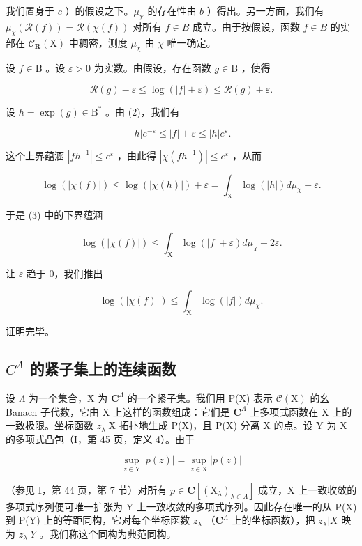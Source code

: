我们置身于 \(c\) ）的假设之下。\(\mu_{\chi}\) 的存在性由 \(b\) ）得出。另一方面，我们有 \(\mu_{\chi}(\mathcal{R}(f)) = \mathcal{R}(\chi(f))\) 对所有 \(f \in B\) 成立。由于按假设，函数 \(f \in B\) 的实部在 \(\mathcal{C}_{\mathbf{R}}(\mathrm{X})\) 中稠密，测度 \(\mu_{\chi}\) 由 \(\chi\) 唯一确定。

设 \(f \in \mathrm{B}\) 。设 \(\varepsilon > 0\) 为实数。由假设，存在函数 \(g \in \mathrm{B}\) ，使得

\[
\mathcal {R} (g) - \varepsilon \leqslant \log (| f | + \varepsilon) \leqslant \mathcal {R} (g) + \varepsilon .\tag{2}
\]

设 \(h = \exp(g) \in \mathrm{B}^*\) 。由 (2)，我们有

\[
| h | e ^ {- \varepsilon} \leqslant | f | + \varepsilon \leqslant | h | e ^ {\varepsilon}.\tag{3}
\]

这个上界蕴涵 \(|fh^{-1}| \leqslant e^{\varepsilon}\) ，由此得 \(|\chi (fh^{-1})| \leqslant e^{\varepsilon}\) ，从而

\[
\log (| \chi (f) |) \leqslant \log (| \chi (h) |) + \varepsilon = \int_ {\mathrm{X}} \log (| h |) d \mu_ {\chi} + \varepsilon .\tag{4}
\]

于是 (3) 中的下界蕴涵

\[
\log (| \chi (f) |) \leqslant \int_ {\mathrm{X}} \log (| f | + \varepsilon) d \mu_ {\chi} + 2 \varepsilon .
\]

让 \(\varepsilon\) 趋于 0，我们推出

\[
\log (| \chi (f) |) \leqslant \int_ {\mathrm{X}} \log (| f |) d \mu_ {\chi}.
\]

证明完毕。

\subsection{\texorpdfstring{\(C^{\Lambda}\) 的紧子集上的连续函数}{C\^{}\{Lambda\} 的紧子集上的连续函数}}

设 \(\Lambda\) 为一个集合，X 为 \(\mathbf{C}^{\Lambda}\) 的一个紧子集。我们用 P(X) 表示 \(\mathcal{C}(\mathrm{X})\) 的幺 Banach 子代数，它由 X 上这样的函数组成：它们是 \(\mathbf{C}^{\Lambda}\) 上多项式函数在 X 上的一致极限。坐标函数 \(z_{\lambda}|\mathrm{X}\) 拓扑地生成 P(X)，且 P(X) 分离 X 的点。设 Y 为 X 的多项式凸包（I，第 45 页，定义 4）。由于

\[
\sup _ {z \in \mathrm{Y}} | p (z) | = \sup _ {z \in \mathrm{X}} | p (z) |
\]

（参见 I，第 44 页，第 7 节）对所有 \(p \in \mathbf{C}[(\mathrm{X}_{\lambda})_{\lambda \in \Lambda}]\) 成立，X 上一致收敛的多项式序列便可唯一扩张为 Y 上一致收敛的多项式序列。因此存在唯一的从 P(X) 到 P(Y) 上的等距同构，它对每个坐标函数 \(z_{\lambda}\) （\(\mathbf{C}^{\Lambda}\) 上的坐标函数），把 \(z_{\lambda}|X\) 映为 \(z_{\lambda}|Y\) 。我们称这个同构为典范同构。

